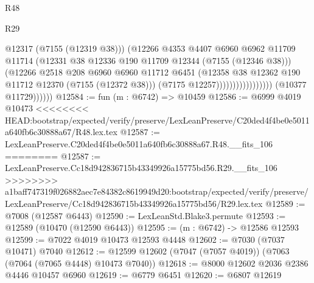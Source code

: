 \begin{lexlean}{R48}
\begin{lexlean}{R29}
\begin{coremodule}
{{{{{{{{{{{{{{{{{{{{{{{{{{{{{{{{{{{{{{{{{{{{{{{{{{{{{{{{{{{{{{{{{{{{{{{{{{{{{{{{{{{{{{{{{{{{{{{{{{{{{{{{{{{{{{{{{{{{{{{{{{{{{{{{{{{{{{{{{{{{{{{{{{{{{{{{{{{{{{{{{{{{{{{{{{{{{{{{{{{{{{{{{{{{{{{{{{{{{{{{{{{{{{{{{{{{{{{{{{                                            @12317
                                            (@7155 (@12319 @38)))
                                          (@12266
                                            @4353
                                            @4407
                                            @6960
                                            @6962
                                            @11709
                                            @11714
                                            (@12331
                                              @38
                                              @12336
                                              @190
                                              @11709
                                              @12344
                                              (@7155 (@12346 @38)))
                                            (@12266
                                              @2518
                                              @208
                                              @6960
                                              @6960
                                              @11712
                                              @6451
                                              (@12358
                                                @38
                                                @12362
                                                @190
                                                @11712
                                                @12370
                                                (@7155 (@12372 @38)))
                                              (@7175 @12257)))))))))))))))))
              (@10377 @11729))))))
@12584 := fun (m : @6742) => @10459
@12586 := @6999 @4019 @10473
<<<<<<<< HEAD:bootstrap/expected/verify/preserve/LexLeanPreserve/C20ded4f4be0e5011a640fb6c30888a67/R48.lex.tex
@12587 := LexLeanPreserve.C20ded4f4be0e5011a640fb6c30888a67.R48.__fits_106
========
@12587 := LexLeanPreserve.Cc18d942836715b43349926a15775bd56.R29.__fits_106
>>>>>>>> a1baff747319f026882aec7e84382c8619949d20:bootstrap/expected/verify/preserve/LexLeanPreserve/Cc18d942836715b43349926a15775bd56/R29.lex.tex
@12589 := @7008 (@12587 @6443)
@12590 := LexLeanStd.Blake3.permute
@12593 := @12589 (@10470 (@12590 @6443))
@12595 := (m : @6742) -> @12586 @12593
@12599 := @7022 @4019 @10473 @12593 @4448
@12602 := @7030 (@7037 @10471) @7040
@12612 := @12599 @12602 (@7047 (@7057 @4019)) (@7063 (@7064 (@7065 @4448) @10473 @7040))
@12618 := @8000 @12602 @2036 @2386 @4446 @10457 @6960
@12619 := @6779 @6451
@12620 := @6807 @12619
}}}}}}}}}}}}}}}}}}}}}}}}}}}}}}}}}}}}}}}}}}}}}}}}}}}}}}}}}}}}}}}}}}}}}}}}}}}}}}}}}}}}}}}}}}}}}}}}}}}}}}}}}}}}}}}}}}}}}}}}}}}}}}}}}}}}}}}}}}}}}}}}}}}}}}}}}}}}}}}}}}}}}}}}}}}}}}}}}}}}}}}}}}}}}}}}}}}}}}}}}}}}}}}}}}}}}}}}}}
\end{coremodule}
\end{lexlean}
\end{lexlean}
